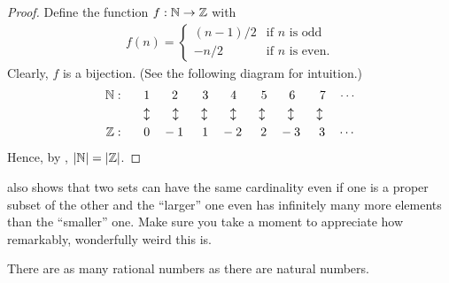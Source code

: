 \documentclass[11pt,twoside=off,numbers=noenddot]{scrbook}
\begin{document}
\begin{proof}
    Define the function $f : \mathbb N \to \mathbb Z$ with
    \begin{align*}
        f(n) = \begin{cases}
            (n - 1) / 2 & \text{if $n$ is odd} \\
            - n / 2 & \text{if $n$ is even}.
        \end{cases}
    \end{align*}
    Clearly, $f$ is a bijection. (See the following diagram for intuition.)
    \begin{align*}
        \mathbb N : \phantom{.}\quad & \phantom{.}1 \quad \phantom{-}2 \quad \phantom{''''}3 \quad \phantom{-}4 \quad \phantom{''''}5 \quad \phantom{-}6 \quad \phantom{''''}7 \quad \cdots \\
        & \updownarrow \quad \phantom{.}\updownarrow \quad \phantom{.}\updownarrow \quad \phantom{.}\updownarrow \quad \phantom{.}\updownarrow \quad \phantom{.}\updownarrow \quad \phantom{.}\updownarrow \\
        \mathbb Z : \phantom{.}\quad & \phantom{.}0 \quad -1 \quad \phantom{''}1 \quad -2 \quad \phantom{''}2 \quad -3 \quad \phantom{''}3 \quad \cdots
    \end{align*}
    Hence, by , $| \mathbb N | = | \mathbb Z |$.
\end{proof}

\begin{remark}
     also shows that two sets can have the same cardinality even if one is a proper subset of the other and the ``larger'' one even has infinitely many more elements than the ``smaller'' one. Make sure you take a moment to appreciate how remarkably, wonderfully weird this is.
\end{remark}

\begin{theorem}[$\abs{\QQ} = \abs{\NN}$]
    There are as many rational numbers as there are natural numbers.
\end{theorem}
\end{document}
